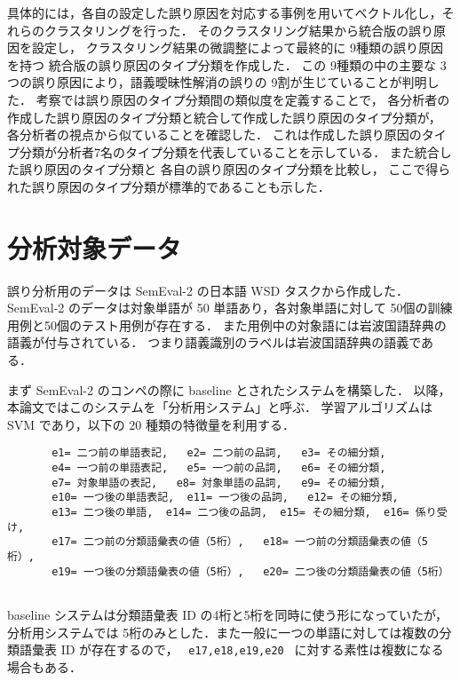 \documentclass[japanese]{jnlp_1.4}
\begin{document}
具体的には，各自の設定した誤り原因を対応する事例を用いてベクトル化し，それらのクラスタリングを行った．
そのクラスタリング結果から統合版の誤り原因を設定し，
クラスタリング結果の微調整によって最終的に 9種類の誤り原因を持つ
統合版の誤り原因のタイプ分類を作成した．
この 9種類の中の主要な 3つの誤り原因により，語義曖昧性解消の誤りの 9割が生じていることが判明した．
考察では誤り原因のタイプ分類間の類似度を定義することで，
各分析者の作成した誤り原因のタイプ分類と統合して作成した誤り原因のタイプ分類が，
各分析者の視点から似ていることを確認した．
これは作成した誤り原因のタイプ分類が分析者7名のタイプ分類を代表していることを示している．
また統合した誤り原因のタイプ分類と
各自の誤り原因のタイプ分類を比較し，
ここで得られた誤り原因のタイプ分類が標準的であることも示した．


\section{分析対象データ}

誤り分析用のデータは SemEval-2 の日本語 WSD タスクから作成した\cite{semeval-2010}．
SemEval-2 のデータは対象単語が 50 単語あり，各対象単語に対して
50個の訓練用例と50個のテスト用例が存在する．
また用例中の対象語には岩波国語辞典\cite{iwakoku5}の語義が付与されている．
つまり語義識別のラベルは岩波国語辞典の語義である．

まず SemEval-2 のコンペの際に baseline とされたシステムを構築した．
以降，本論文ではこのシステムを「分析用システム」と呼ぶ．
学習アルゴリズムは SVM であり，以下の 20 種類の特徴量を利用する．

\vspace{0.5\Cvs}
\small
\begin{verbatim}
       e1= 二つ前の単語表記,   e2= 二つ前の品詞,   e3= その細分類,   
       e4= 一つ前の単語表記,   e5= 一つ前の品詞,   e6= その細分類,     
       e7= 対象単語の表記,   e8= 対象単語の品詞,   e9= その細分類,     
       e10= 一つ後の単語表記,  e11= 一つ後の品詞,   e12= その細分類,
       e13= 二つ後の単語,  e14= 二つ後の品詞,  e15= その細分類,  e16= 係り受け,
       e17= 二つ前の分類語彙表の値（5桁）,   e18= 一つ前の分類語彙表の値（5桁）,
       e19= 一つ後の分類語彙表の値（5桁）,   e20= 二つ後の分類語彙表の値（5桁）
          
\end{verbatim}
\normalsize

baseline システムは分類語彙表 ID の4桁と5桁を同時に使う形になっていたが，
分析用システムでは 5桁のみとした．また一般に一つの単語に対しては複数の分類語彙表 ID が存在するので，
\verb| e17,e18,e19,e20 | に対する素性は複数になる場合もある．
\end{document}
